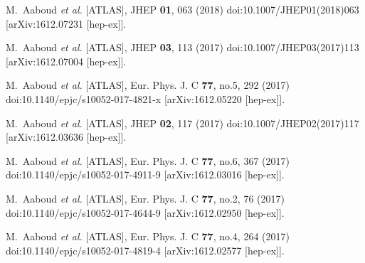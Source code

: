 \begin{thebibliography}{9}
M.~Aaboud \textit{et al.} [ATLAS],
JHEP \textbf{01}, 063 (2018)
doi:10.1007/JHEP01(2018)063
[arXiv:1612.07231 [hep-ex]].

M.~Aaboud \textit{et al.} [ATLAS],
JHEP \textbf{03}, 113 (2017)
doi:10.1007/JHEP03(2017)113
[arXiv:1612.07004 [hep-ex]].

M.~Aaboud \textit{et al.} [ATLAS],
Eur. Phys. J. C \textbf{77}, no.5, 292 (2017)
doi:10.1140/epjc/s10052-017-4821-x
[arXiv:1612.05220 [hep-ex]].

M.~Aaboud \textit{et al.} [ATLAS],
JHEP \textbf{02}, 117 (2017)
doi:10.1007/JHEP02(2017)117
[arXiv:1612.03636 [hep-ex]].

M.~Aaboud \textit{et al.} [ATLAS],
Eur. Phys. J. C \textbf{77}, no.6, 367 (2017)
doi:10.1140/epjc/s10052-017-4911-9
[arXiv:1612.03016 [hep-ex]].

M.~Aaboud \textit{et al.} [ATLAS],
Eur. Phys. J. C \textbf{77}, no.2, 76 (2017)
doi:10.1140/epjc/s10052-017-4644-9
[arXiv:1612.02950 [hep-ex]].

M.~Aaboud \textit{et al.} [ATLAS],
Eur. Phys. J. C \textbf{77}, no.4, 264 (2017)
doi:10.1140/epjc/s10052-017-4819-4
[arXiv:1612.02577 [hep-ex]].


\end{thebibliography}
